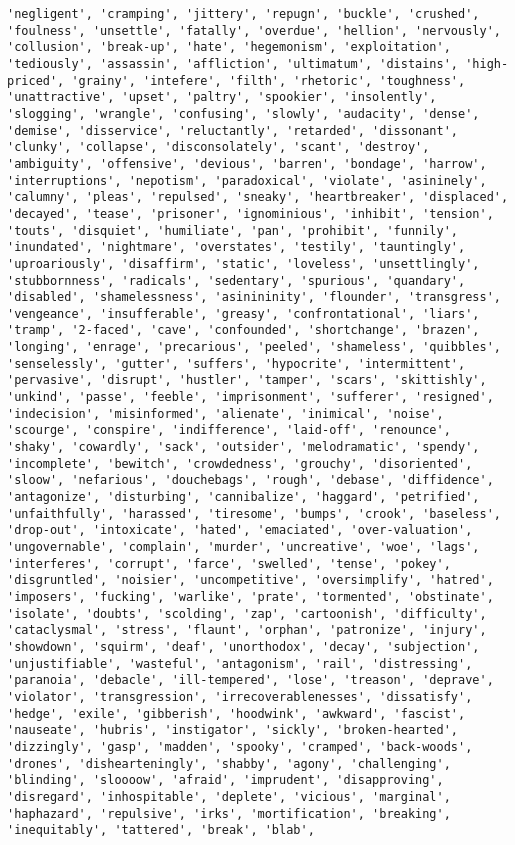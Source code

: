 \documentclass[11pt]{article}
\begin{document}
\begin{Verbatim}[commandchars=\\\{\}]
'negligent', 'cramping', 'jittery', 'repugn', 'buckle', 'crushed', 'foulness', 'unsettle', 'fatally', 'overdue', 'hellion', 'nervously', 'collusion', 'break-up', 'hate', 'hegemonism', 'exploitation', 'tediously', 'assassin', 'affliction', 'ultimatum', 'distains', 'high-priced', 'grainy', 'intefere', 'filth', 'rhetoric', 'toughness', 'unattractive', 'upset', 'paltry', 'spookier', 'insolently', 'slogging', 'wrangle', 'confusing', 'slowly', 'audacity', 'dense', 'demise', 'disservice', 'reluctantly', 'retarded', 'dissonant', 'clunky', 'collapse', 'disconsolately', 'scant', 'destroy', 'ambiguity', 'offensive', 'devious', 'barren', 'bondage', 'harrow', 'interruptions', 'nepotism', 'paradoxical', 'violate', 'asininely', 'calumny', 'pleas', 'repulsed', 'sneaky', 'heartbreaker', 'displaced', 'decayed', 'tease', 'prisoner', 'ignominious', 'inhibit', 'tension', 'touts', 'disquiet', 'humiliate', 'pan', 'prohibit', 'funnily', 'inundated', 'nightmare', 'overstates', 'testily', 'tauntingly', 'uproariously', 'disaffirm', 'static', 'loveless', 'unsettlingly', 'stubbornness', 'radicals', 'sedentary', 'spurious', 'quandary', 'disabled', 'shamelessness', 'asinininity', 'flounder', 'transgress', 'vengeance', 'insufferable', 'greasy', 'confrontational', 'liars', 'tramp', '2-faced', 'cave', 'confounded', 'shortchange', 'brazen', 'longing', 'enrage', 'precarious', 'peeled', 'shameless', 'quibbles', 'senselessly', 'gutter', 'suffers', 'hypocrite', 'intermittent', 'pervasive', 'disrupt', 'hustler', 'tamper', 'scars', 'skittishly', 'unkind', 'passe', 'feeble', 'imprisonment', 'sufferer', 'resigned', 'indecision', 'misinformed', 'alienate', 'inimical', 'noise', 'scourge', 'conspire', 'indifference', 'laid-off', 'renounce', 'shaky', 'cowardly', 'sack', 'outsider', 'melodramatic', 'spendy', 'incomplete', 'bewitch', 'crowdedness', 'grouchy', 'disoriented', 'sloow', 'nefarious', 'douchebags', 'rough', 'debase', 'diffidence', 'antagonize', 'disturbing', 'cannibalize', 'haggard', 'petrified', 'unfaithfully', 'harassed', 'tiresome', 'bumps', 'crook', 'baseless', 'drop-out', 'intoxicate', 'hated', 'emaciated', 'over-valuation', 'ungovernable', 'complain', 'murder', 'uncreative', 'woe', 'lags', 'interferes', 'corrupt', 'farce', 'swelled', 'tense', 'pokey', 'disgruntled', 'noisier', 'uncompetitive', 'oversimplify', 'hatred', 'imposers', 'fucking', 'warlike', 'prate', 'tormented', 'obstinate', 'isolate', 'doubts', 'scolding', 'zap', 'cartoonish', 'difficulty', 'cataclysmal', 'stress', 'flaunt', 'orphan', 'patronize', 'injury', 'showdown', 'squirm', 'deaf', 'unorthodox', 'decay', 'subjection', 'unjustifiable', 'wasteful', 'antagonism', 'rail', 'distressing', 'paranoia', 'debacle', 'ill-tempered', 'lose', 'treason', 'deprave', 'violator', 'transgression', 'irrecoverablenesses', 'dissatisfy', 'hedge', 'exile', 'gibberish', 'hoodwink', 'awkward', 'fascist', 'nauseate', 'hubris', 'instigator', 'sickly', 'broken-hearted', 'dizzingly', 'gasp', 'madden', 'spooky', 'cramped', 'back-woods', 'drones', 'dishearteningly', 'shabby', 'agony', 'challenging', 'blinding', 'sloooow', 'afraid', 'imprudent', 'disapproving', 'disregard', 'inhospitable', 'deplete', 'vicious', 'marginal', 'haphazard', 'repulsive', 'irks', 'mortification', 'breaking', 'inequitably', 'tattered', 'break', 'blab', 
\end{Verbatim}
\end{document}
